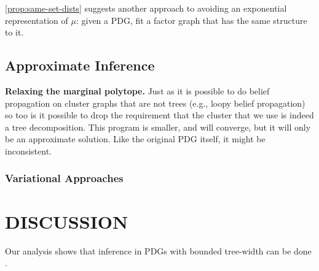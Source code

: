 \documentclass{article}
\begin{document}


\cref{prop:same-set-dists} suggests another approach to avoiding an exponential representation of $\mu$: given a PDG, fit a factor graph that has the same structure to it.

\subsection{Approximate Inference}
\textbf{Relaxing the marginal polytope.}
Just as it is possible to do belief propagation on cluster graphs that are not trees (e.g., loopy belief propagation)
so too is it possible to drop the requirement that the cluster that we use is indeed a tree decomposition.
This program is smaller, and will converge, but it will only be an approximate solution.
Like the original PDG itself, it might be inconsistent.

\subsubsection{Variational Approaches}






\section{DISCUSSION}

Our analysis shows that inference in PDGs with bounded tree-width can be done .


\end{document}
